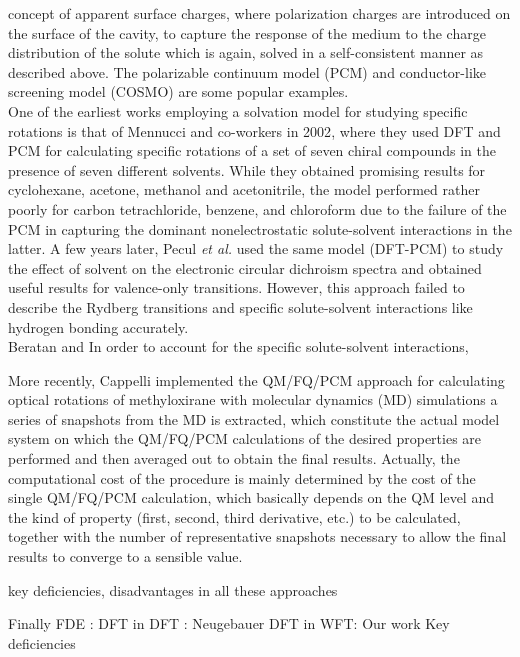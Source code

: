 concept of apparent surface charges\cite{}, where polarization charges are introduced on the surface of the 
cavity, to capture the response of the medium to the charge distribution of the solute which is again, 
solved in a self-consistent manner as described above. The polarizable continuum model (PCM) \cite{} and conductor-like 
screening model (COSMO) \cite{} are some popular examples.\\
One of the earliest works employing a solvation model for studying specific rotations is that of 
Mennucci and co-workers in 2002\cite{Mennucci02}, where they used DFT and PCM for calculating 
specific rotations of a set of seven chiral compounds in the presence of seven different 
solvents. While they obtained promising results for cyclohexane, acetone, methanol and 
acetonitrile, the model performed rather poorly for carbon tetrachloride, benzene, and chloroform
due to the failure of the PCM in capturing the dominant nonelectrostatic solute-solvent interactions 
in the latter. A few years later, Pecul {\em et al.} \cite{} used the same model (DFT-PCM) to study the effect
of solvent on the electronic circular dichroism spectra and obtained useful results for valence-only transitions. 
However, this approach failed to describe the Rydberg transitions and specific solute-solvent 
interactions like hydrogen bonding accurately.\\

Beratan and 
In order to account for the specific solute-solvent interactions, 



More recently, Cappelli implemented the
QM/FQ/PCM approach for calculating optical rotations of methyloxirane
with molecular dynamics (MD) simulations
 a series of snapshots from the MD is extracted, which constitute the actual model system on which the QM/FQ/PCM calculations of the desired properties are performed and then averaged out to obtain the final results. Actually, the computational cost of the procedure is mainly determined by the cost of the single QM/FQ/PCM calculation, which basically depends on the QM level and the kind of property (first, second, third derivative, etc.) to be calculated, together with the number of representative snapshots necessary to allow the final results to converge to a sensible value.

key deficiencies, disadvantages in all these approaches

Finally FDE : DFT in DFT : Neugebauer
DFT in WFT: Our work 
Key deficiencies

